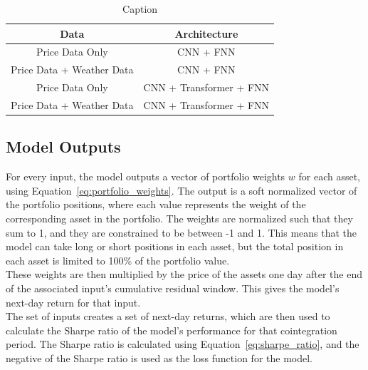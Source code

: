 \documentclass[12pt]{article}
\begin{document}
\begin{table}[htpb]
    \centering
    \begin{tabular}{c|c}
        Data & Architecture \\ 
        \hline \hline 
        Price Data Only & CNN + FNN \\ 
        Price Data + Weather Data & CNN + FNN \\ 
        Price Data Only & CNN + Transformer + FNN \\ 
        Price Data + Weather Data & CNN + Transformer + FNN \\
        \hline \hline 
    \end{tabular}
    \caption{Caption}
    \label{tab:my_label}
\end{table}

\subsection*{Model Outputs}

For every input, the model outputs a vector of portfolio weights $w$ for each asset, using Equation~\ref{eq:portfolio_weights}. The output is a soft normalized vector of the portfolio positions, where each value represents the weight of the corresponding asset in the portfolio. The weights are normalized such that they sum to 1, and they are constrained to be between -1 and 1. This means that the model can take long or short positions in each asset, but the total position in each asset is limited to 100\% of the portfolio value. 
\\

These weights are then multiplied by the price of the assets one day after the end of the associated input's cumulative residual window. This gives the model's next-day return for that input.
\\

The set of inputs creates a set of next-day returns, which are then used to calculate the Sharpe ratio of the model's performance for that cointegration period. The Sharpe ratio is calculated using Equation~\ref{eq:sharpe_ratio}, and the negative of the Sharpe ratio is used as the loss function for the model.
\end{document}

